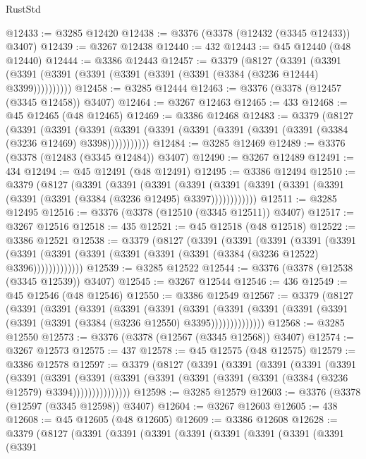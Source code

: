 \begin{lexlean}{RustStd}
\begin{coremodule}
@12433 := @3285 @12420
@12438 := @3376 (@3378 (@12432 (@3345 @12433)) @3407)
@12439 := @3267 @12438
@12440 := 432
@12443 := @45 @12440 (@48 @12440)
@12444 := @3386 @12443
@12457 := @3379
    (@8127
      (@3391 (@3391 (@3391 (@3391 (@3391 (@3391 (@3391 (@3391 (@3384 (@3236 @12444) @3399))))))))))
@12458 := @3285 @12444
@12463 := @3376 (@3378 (@12457 (@3345 @12458)) @3407)
@12464 := @3267 @12463
@12465 := 433
@12468 := @45 @12465 (@48 @12465)
@12469 := @3386 @12468
@12483 := @3379
    (@8127
      (@3391
        (@3391
          (@3391 (@3391 (@3391 (@3391 (@3391 (@3391 (@3391 (@3384 (@3236 @12469) @3398)))))))))))
@12484 := @3285 @12469
@12489 := @3376 (@3378 (@12483 (@3345 @12484)) @3407)
@12490 := @3267 @12489
@12491 := 434
@12494 := @45 @12491 (@48 @12491)
@12495 := @3386 @12494
@12510 := @3379
    (@8127
      (@3391
        (@3391
          (@3391
            (@3391 (@3391 (@3391 (@3391 (@3391 (@3391 (@3391 (@3384 (@3236 @12495) @3397))))))))))))
@12511 := @3285 @12495
@12516 := @3376 (@3378 (@12510 (@3345 @12511)) @3407)
@12517 := @3267 @12516
@12518 := 435
@12521 := @45 @12518 (@48 @12518)
@12522 := @3386 @12521
@12538 := @3379
    (@8127
      (@3391
        (@3391
          (@3391
            (@3391
              (@3391
                (@3391 (@3391 (@3391 (@3391 (@3391 (@3391 (@3384 (@3236 @12522) @3396)))))))))))))
@12539 := @3285 @12522
@12544 := @3376 (@3378 (@12538 (@3345 @12539)) @3407)
@12545 := @3267 @12544
@12546 := 436
@12549 := @45 @12546 (@48 @12546)
@12550 := @3386 @12549
@12567 := @3379
    (@8127
      (@3391
        (@3391
          (@3391
            (@3391
              (@3391
                (@3391
                  (@3391
                    (@3391 (@3391 (@3391 (@3391 (@3391 (@3384 (@3236 @12550) @3395))))))))))))))
@12568 := @3285 @12550
@12573 := @3376 (@3378 (@12567 (@3345 @12568)) @3407)
@12574 := @3267 @12573
@12575 := 437
@12578 := @45 @12575 (@48 @12575)
@12579 := @3386 @12578
@12597 := @3379
    (@8127
      (@3391
        (@3391
          (@3391
            (@3391
              (@3391
                (@3391
                  (@3391
                    (@3391
                      (@3391 (@3391 (@3391 (@3391 (@3391 (@3384 (@3236 @12579) @3394)))))))))))))))
@12598 := @3285 @12579
@12603 := @3376 (@3378 (@12597 (@3345 @12598)) @3407)
@12604 := @3267 @12603
@12605 := 438
@12608 := @45 @12605 (@48 @12605)
@12609 := @3386 @12608
@12628 := @3379
    (@8127
      (@3391
        (@3391
          (@3391
            (@3391
              (@3391
                (@3391
                  (@3391
                    (@3391
                      (@3391

\end{coremodule}
\end{lexlean}

